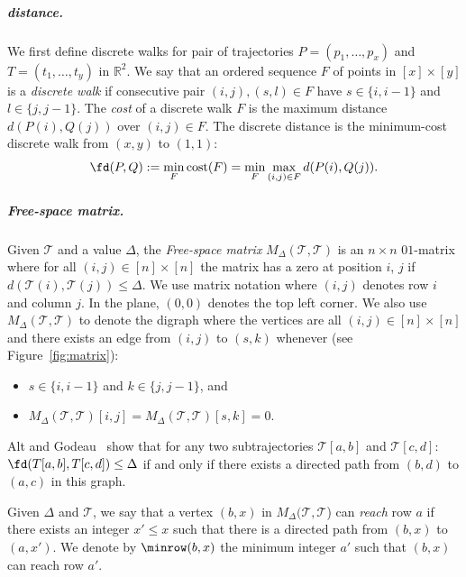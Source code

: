 \documentclass[english, thm-restate]{lipics-v2021}
\begin{document}
 
\subparagraph{\frechet distance.}
We first define discrete walks for pair of trajectories $P = (p_1, \ldots, p_x)$ and $T = (t_1, \ldots, t_y)$ in $\mathbb{R}^2$.
We say that an ordered sequence $F$ of points in $[x] \times [y]$ is a \emph{discrete walk} if consecutive pair $(i, j), (s, l) \in F$ have $s\in \{i,i-1\}$ and $l\in\{j,j-1\}$.
The \emph{cost} of a discrete walk $F$ is the maximum distance $d(P(i), Q(j))$ over $(i, j) \in F$.
The discrete \frechet distance is the minimum-cost discrete walk from $(x, y)$ to $(1, 1)$:
\[
\fd(P, Q) := \min_{F }  \textnormal{cost}(F) = \min_{F } \max_{(i, j) \in F} d(P(i), Q(j)).
\]

\subparagraph{Free-space matrix.}
Given $\mathcal{T}$ and  a value $\Delta$, the \emph{Free-space matrix} $M_\Delta(\mathcal{T}, \mathcal{T})$ is an $n \times n$ $01$-matrix where for all $(i, j) \in [n] \times [n]$ the matrix has a zero at position $i$, $j$ if $d(\mathcal{T}(i), \mathcal{T}(j)) \leq \Delta$.  We use matrix notation where $(i, j)$ denotes row $i$ and column $j$.
In the plane, $(0, 0)$ denotes the top left corner.
We also use $M_\Delta(\mathcal{T}, \mathcal{T})$ to denote the digraph where the vertices are all $(i, j) \in [n] \times [n]$ and there exists an edge from $(i, j)$ to $(s, k)$ whenever (see Figure~\ref{fig:matrix}):
\begin{itemize}
    \item $s \in \{ i, i -1 \}$ and $k \in \{ j, j - 1 \}$, and
    \item  $M_\Delta(\mathcal{T}, \mathcal{T})[i, j] = M_\Delta(\mathcal{T}, \mathcal{T})[s, k] = 0$.
\end{itemize}

\noindent
Alt and Godeau~\cite{alt1995computing} show that for any two subtrajectories $\mathcal{T}[a, b]$  and $\mathcal{T}[c, d]$: $\fd(T[a, b], T[c, d]) \leq \Delta$ if and only if there exists a directed path from $(b, d)$ to $(a, c)$ in this graph. 

\begin{definition}
\label{def:minrow}
    Given $\Delta$ and $\mathcal{T}$, we say that a vertex $(b, x)$ in $M_\Delta(\mathcal{T}, \mathcal{T}$) can \emph{reach} row $a$ if there exists an integer $x' \leq x$ such that there is a directed path from $(b, x)$ to $(a, x')$. We denote by $\minrow(b, x)$ the minimum integer $a'$ such that $(b, x)$ can reach row $a'$. 
    \end{definition}
\end{document}
